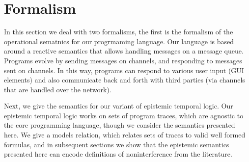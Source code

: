 \documentclass[conference]{IEEEtran}
\theoremstyle{definition}
\begin{document}
\section{Formalism}
\label{sec:formalism}

In this section we deal with two formalisms, the first is the
formalism of the operational sematnics for our progrmaming language.
Our language is based around a reactive semantics that allows handling
messages on a message queue.  Programs evolve by sending messages on
channels, and responding to messages sent on channels.  In this way,
programs can respond to various user input (GUI elements) and also
communicate back and forth with third parties (via channels that are
handled over the network).

Next, we give the semantics for our variant of epistemic temporal
logic.  Our epistemic temporal logic works on sets of program traces,
which are agnostic to the core programming language, though we
consider the semantics presented here.  We give a models relation,
which relates sets of traces to valid well formed formulas, and in
subsequent sections we show that the epistemic semantics presented
here can encode definitions of noninterference from the literature.
\end{document}
